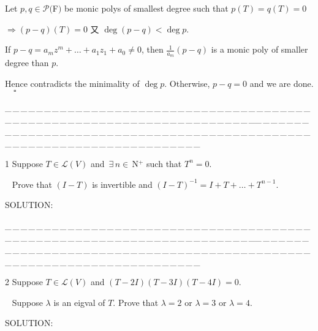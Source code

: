 \documentclass[a4paper, 11pt, UTF8]{article}
\def\Lm{\mathcal{L}}
\def\Po{\mathcal{P}}
\def\Nbp{$\,{\timesbf N}$^+}
\begin{document}
\begin{large}
Let $p,q\in\Po(${\timesbf F}$)$ be monic polys of smallest degree such that $p(T)=q(T) = 0$\par\quad
$\Rightarrow (p-q)(T)=0$ 又 $\deg(p-q)<\deg p$.\par\quad
If $p - q=a_m z^m+\dots+a_1 z_1 +a_0\neq 0$, then $\frac{1}{a_m}(p-q)$ is a monic poly of smaller degree than $p$. \par\quad
Hence contradicts the minimality of $\deg p$. Otherwise, $p-q=0$ and we are done.$\quad\square$\par
{\tiny \_\,\_\,\_\,\_\,\_\,\_\,\_\,\_\,\_\,\_\,\_\,\_\,\_\,\_\,\_\,\_\,\_\,\_\,\_\,\_\,\_\,\_\,\_\,\_\,\_\,\_\,\_\,\_\,\_\,\_\,\_\,\_\,\_\,\_\,\_\,\_\,\_\,\_\,\_\,\_\,\_\,\_\,\_\,\_\,\_\,\_\,\_\,\_\,\_\,\_\,\_\,\_\,\_\,\_\,\_\,\_\,\_\,\_\,\_\,\_\,\_\,\_\,\_\,\_\,\_\,\_\,\_\,\_\,\_\,\_\,\_\_\,\_\,\_\,\_\,\_\,\_\,\_\,\_\,\_\,\_\,\_\,\_\,\_\,\_\,\_\,\_\,\_\,\_\,\_\,\_\,\_\,\_\,\_\,\_\,\_\,\_\,\_\,\_\,\_\,\_\,\_\,\_\,\_\,\_\,\_\,\_\,\_\,\_\,\_\,\_\,\_\,\_\,\_\,\_\,\_\,\_\,\_\,\_\,\_\,\_\,\_\,\_\,\_\,\_\,\_\,\_\,\_\,\_\,\_\,\_\,\_\,\_\,\_\,\_\,\_\,\_\,\_\,\_\,\_\,\_\,\_}\par

{\timesbf\Large 1} {\timessl\Large 
Suppose $T\in\Lm(V)$ and $\,\exists\,n\in\Nbp$ such that $T^n=0.$}\par\,\,\,
{\timessl\Large Prove that $(I-T)$ is invertible and $(I-T)^{-1}=I+T+\dots+T^{n-1}.$}\par
{\timesbf S\footnotesize{OLUTION:}}\par\quad

\par
{\tiny \_\,\_\,\_\,\_\,\_\,\_\,\_\,\_\,\_\,\_\,\_\,\_\,\_\,\_\,\_\,\_\,\_\,\_\,\_\,\_\,\_\,\_\,\_\,\_\,\_\,\_\,\_\,\_\,\_\,\_\,\_\,\_\,\_\,\_\,\_\,\_\,\_\,\_\,\_\,\_\,\_\,\_\,\_\,\_\,\_\,\_\,\_\,\_\,\_\,\_\,\_\,\_\,\_\,\_\,\_\,\_\,\_\,\_\,\_\,\_\,\_\,\_\,\_\,\_\,\_\,\_\,\_\,\_\,\_\,\_\,\_\_\,\_\,\_\,\_\,\_\,\_\,\_\,\_\,\_\,\_\,\_\,\_\,\_\,\_\,\_\,\_\,\_\,\_\,\_\,\_\,\_\,\_\,\_\,\_\,\_\,\_\,\_\,\_\,\_\,\_\,\_\,\_\,\_\,\_\,\_\,\_\,\_\,\_\,\_\,\_\,\_\,\_\,\_\,\_\,\_\,\_\,\_\,\_\,\_\,\_\,\_\,\_\,\_\,\_\,\_\,\_\,\_\,\_\,\_\,\_\,\_\,\_\,\_\,\_\,\_\,\_\,\_\,\_\,\_\,\_\,\_}\par

{\timesbf\Large 2} {\timessl\Large 
Suppose $T\in\Lm(V)$ and $(T - 2I)(T - 3I)(T - 4I) = 0$.}\par\,\,\,
{\timessl\Large Suppose $\lambda$ is an eigval of $T$. Prove that $\lambda = 2$ or $\lambda = 3$ or $\lambda = 4$.
}\par
{\timesbf S\footnotesize{OLUTION:}}\par\quad


\end{large}
\end{document}
